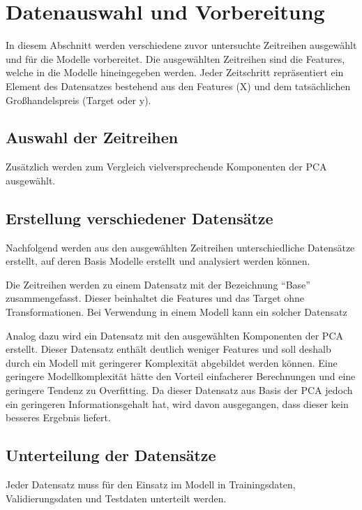 \section{Datenauswahl und Vorbereitung}
In diesem Abschnitt werden verschiedene zuvor untersuchte Zeitreihen ausgewählt und für die Modelle vorbereitet. Die ausgewählten Zeitreihen sind die Features, welche in die Modelle hineingegeben werden. Jeder Zeitschritt repräsentiert ein Element des Datensatzes bestehend aus den Features (X) und dem tatsächlichen Großhandelspreis (Target oder y).

\subsection{Auswahl der Zeitreihen}


Zusätzlich werden zum Vergleich vielversprechende Komponenten der PCA ausgewählt. 

\subsection{Erstellung verschiedener Datensätze}
Nachfolgend werden aus den ausgewählten Zeitreihen unterschiedliche Datensätze erstellt, auf deren Basis Modelle erstellt und analysiert werden können.

Die Zeitreihen werden zu einem Datensatz mit der Bezeichnung ``Base'' zusammengefasst. Dieser beinhaltet die Features und das Target ohne Transformationen. Bei Verwendung in einem Modell kann ein solcher Datensatz   

Analog dazu wird ein Datensatz mit den ausgewählten Komponenten der PCA erstellt. Dieser Datensatz enthält deutlich weniger Features und soll deshalb durch ein Modell mit geringerer Komplexität abgebildet werden können. Eine geringere Modellkomplexität hätte den Vorteil einfacherer Berechnungen und eine geringere Tendenz zu Overfitting. Da dieser Datensatz aus Basis der PCA jedoch ein geringeren Informationsgehalt hat, wird davon ausgegangen, dass dieser kein besseres Ergebnis liefert.

\subsection{Unterteilung der Datensätze}
Jeder Datensatz muss für den Einsatz im Modell in Trainingsdaten, Validierungsdaten und Testdaten unterteilt werden. 

